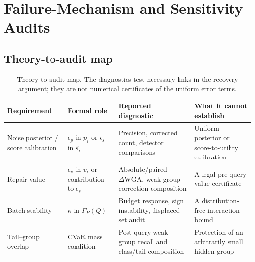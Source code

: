 \documentclass{article}
\newcommand{\dwga}{\ensuremath{\Delta\mathrm{WGA}}}
\begin{document}
\section{Failure-Mechanism and Sensitivity Audits}
\label{app:evidence}

\subsection{Theory-to-audit map}
\label{app:theory-audit}
\begin{table}[t]
\caption{Theory-to-audit map. The diagnostics test necessary links in the recovery argument; they are not numerical certificates of the uniform error terms.}
\label{tab:theory-audit}
\centering
\scriptsize
\setlength{\tabcolsep}{3.0pt}
\begin{tabular}{p{}p{}p{}p{}}
\toprule
Requirement & Formal role & Reported diagnostic & What it cannot establish \\
\midrule
Noise posterior / score calibration & $\epsilon_p$ in $p_i$ or $\epsilon_s$ in $\hat s_i$ & Precision, corrected count, detector comparisons & Uniform posterior or score-to-utility calibration \\
Repair value & $\epsilon_v$ in $v_i$ or contribution to $\epsilon_s$ & Absolute/paired \dwga{}, weak-group correction composition & A legal pre-query value certificate \\
Batch stability & $\kappa$ in $\Gamma_P(Q)$ & Budget response, sign instability, displaced-set audit & A distribution-free interaction bound \\
Tail--group overlap & CVaR mass condition & Post-query weak-group recall and class/tail composition & Protection of an arbitrarily small hidden group \\
\bottomrule
\end{tabular}
\end{table}
\end{document}
